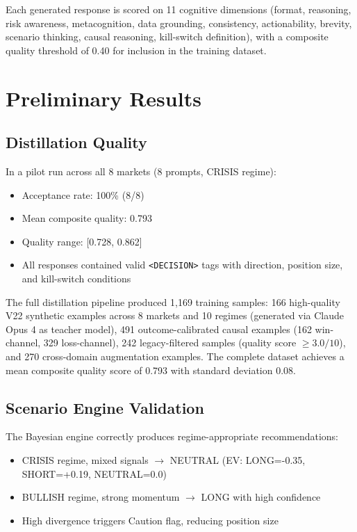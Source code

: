 \documentclass[11pt, a4paper]{article}
\begin{document}
Each generated response is scored on 11 cognitive dimensions (format, reasoning, risk awareness, metacognition, data grounding, consistency, actionability, brevity, scenario thinking, causal reasoning, kill-switch definition), with a composite quality threshold of 0.40 for inclusion in the training dataset.


\section{Preliminary Results}
\label{sec:results}

\subsection{Distillation Quality}

In a pilot run across all 8 markets (8 prompts, CRISIS regime):

\begin{itemize}
  \item Acceptance rate: 100\% (8/8)
  \item Mean composite quality: 0.793
  \item Quality range: [0.728, 0.862]
  \item All responses contained valid \texttt{<DECISION>} tags with direction, position size, and kill-switch conditions
\end{itemize}

The full distillation pipeline produced 1,169 training samples: 166 high-quality V22 synthetic examples across 8 markets and 10 regimes (generated via Claude Opus 4 as teacher model), 491 outcome-calibrated causal examples (162 win-channel, 329 loss-channel), 242 legacy-filtered samples (quality score $\geq 3.0/10$), and 270 cross-domain augmentation examples. The complete dataset achieves a mean composite quality score of 0.793 with standard deviation 0.08.

\subsection{Scenario Engine Validation}

The Bayesian engine correctly produces regime-appropriate recommendations:
\begin{itemize}
  \item CRISIS regime, mixed signals $\rightarrow$ NEUTRAL (EV: LONG=-0.35, SHORT=+0.19, NEUTRAL=0.0)
  \item BULLISH regime, strong momentum $\rightarrow$ LONG with high confidence
  \item High divergence triggers Caution flag, reducing position size
\end{itemize}
\end{document}
